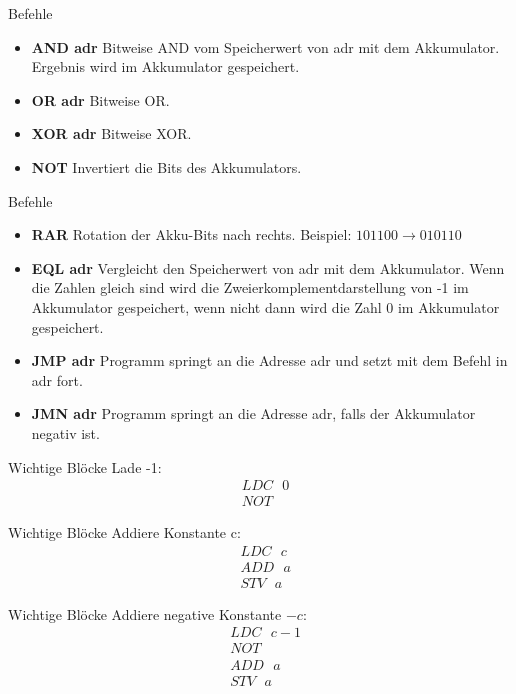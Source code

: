 \begin{frame}{Befehle}
  \begin{itemize}
    \item \textbf{AND adr} Bitweise AND vom Speicherwert von adr mit dem Akkumulator. Ergebnis wird im Akkumulator gespeichert.
    \pause
    \item \textbf{OR adr} Bitweise OR.
    \pause
    \item \textbf{XOR adr} Bitweise XOR.
    \pause
    \item \textbf{NOT} Invertiert die Bits des Akkumulators.
  \end{itemize}
\end{frame}

\begin{frame}{Befehle}
  \begin{itemize}
    \item \textbf{RAR} Rotation der Akku-Bits nach rechts. Beispiel: $101100 \rightarrow 010110$
    \pause
    \item \textbf{EQL adr} Vergleicht den Speicherwert von adr mit dem Akkumulator. Wenn die Zahlen gleich sind wird die Zweierkomplementdarstellung von -1 im Akkumulator gespeichert, wenn nicht dann wird die Zahl 0 im Akkumulator gespeichert.
    \pause
    \item \textbf{JMP adr} Programm springt an die Adresse adr und setzt mit dem Befehl in adr fort.
    \pause
    \item \textbf{JMN adr} Programm springt an die Adresse adr, falls der Akkumulator negativ ist.
  \end{itemize}
\end{frame}

\begin{frame}{Wichtige Blöcke}
  Lade -1:
  \begin{align*}
    &LDC\text{ }0\\
    &NOT
  \end{align*}
\end{frame}

\begin{frame}{Wichtige Blöcke}
  Addiere Konstante c:
  \begin{align*}
    &LDC\text{ }c\\
    &ADD\text{ }a\\
    &STV\text{ }a
  \end{align*}
\end{frame}

\begin{frame}{Wichtige Blöcke}
  Addiere negative Konstante $-c$:
  \begin{align*}
    &LDC\text{ }c-1\\
    &NOT\\
    &ADD\text{ }a\\
    &STV\text{ }a
  \end{align*}
\end{frame}


